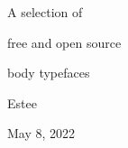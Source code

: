 
\line{}\baselineskip
\startcenter
{}

A selection of

\vskip 10pt
free and open source

\vskip 10pt
body typefaces

\baselineskip

\asterism

\baselineskip

Estee

\vskip 10pt
May 8, 2022

\stopcenter

\vfil\eject
